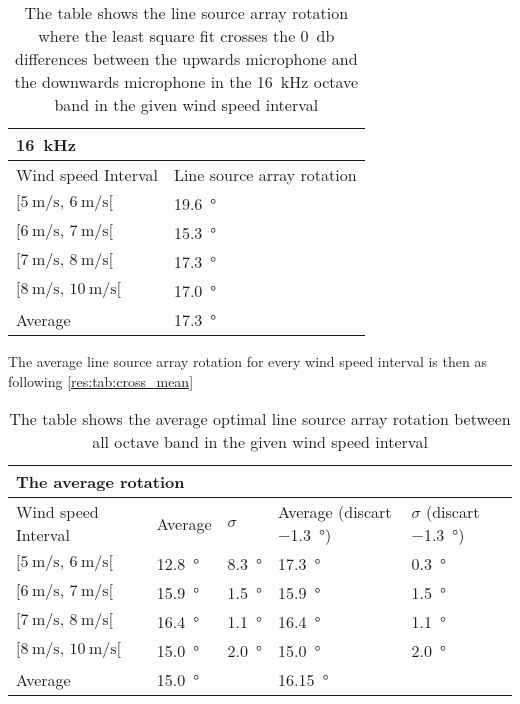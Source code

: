 \begin{table}[H]
 \centering
  \caption{The table shows the line source array rotation where the least square fit crosses the \SI{0}{\decibel} differences between the upwards microphone and the downwards microphone in the \SI{16}{\kilo\hertz} octave band in the given wind speed interval}
\begin{tabular}{l|l}
\multicolumn{2}{l}{\SI{16}{\kilo\hertz}}      \\ \hline
Wind speed Interval & Line source array rotation \\ \hline
  $[\SI{5}{\meter\per\second},\, \SI{6}{\meter\per\second}[ $       &   \SI{19.6}{\degree}    \\
    $[\SI{6}{\meter\per\second},\, \SI{7}{\meter\per\second}[ $     &   \SI{15.3}{\degree}     \\
  $[\SI{7}{\meter\per\second},\, \SI{8}{\meter\per\second}[ $       &    \SI{17.3}{\degree}    \\
   $[\SI{8}{\meter\per\second},\, \SI{10}{\meter\per\second}[ $      &     \SI{17.0}{\degree}  \\ \hline
    Average      &     \SI{17.3}{\degree} 
\end{tabular}
\label{res:tab:cross_16k}
\end{table}    
 
 
The average line source array rotation for every wind speed interval is then as following \autoref{res:tab:cross_mean}

  \begin{table}[H]
 \centering
  \caption{The table shows the average optimal line source array rotation between all octave band in the given wind speed interval}
\begin{tabular}{l|l|l|l|l}
\multicolumn{2}{l}{The average rotation}      \\ \hline
Wind speed Interval & Average  & $\sigma$ & Average (discart  \SI{-1.3}{\degree}) & $\sigma$ (discart  \SI{-1.3}{\degree}) \\ \hline
  $[\SI{5}{\meter\per\second},\, \SI{6}{\meter\per\second}[ $       &   \SI{12.8}{\degree}  &   \SI{8.3}{\degree}  &   \SI{17.3}{\degree}   &   \SI{0.3}{\degree}\\
    $[\SI{6}{\meter\per\second},\, \SI{7}{\meter\per\second}[ $     &   \SI{15.9}{\degree}   &   \SI{1.5}{\degree} &   \SI{15.9}{\degree}   &   \SI{1.5}{\degree}\\
  $[\SI{7}{\meter\per\second},\, \SI{8}{\meter\per\second}[ $       &    \SI{16.4}{\degree}  &   \SI{1.1}{\degree} &    \SI{16.4}{\degree}&    \SI{1.1}{\degree}  \\
   $[\SI{8}{\meter\per\second},\, \SI{10}{\meter\per\second}[ $      &     \SI{15.0}{\degree}  &   \SI{2.0}{\degree} &     \SI{15.0}{\degree} &     \SI{2.0}{\degree} \\ \hline
    Average      &     \SI{15.0}{\degree} &  &\SI{16.15}{\degree}&
\end{tabular}
\label{res:tab:cross_mean}
\end{table}  
 
